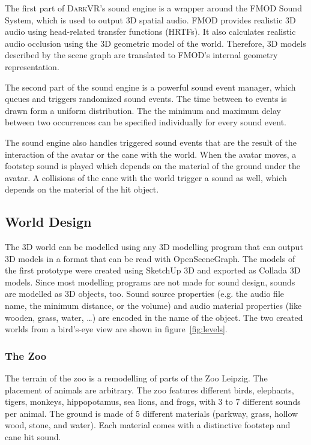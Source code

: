 \documentclass{sig-alternate}
\newcommand{\darkvr}{\textsc{DarkVR}\xspace}
\begin{document}
The first part of \darkvr's sound engine is a wrapper around the FMOD Sound
System\cite{fmod}, which is used to output 3D spatial audio. FMOD provides
realistic 3D audio using head-related transfer functions (HRTFs). It also
calculates realistic audio occlusion using the 3D geometric model of the world.
Therefore, 3D models described by the scene graph are translated to
FMOD's internal geometry representation.

The second part of the sound engine is a powerful sound event manager, which
queues and triggers randomized sound events. The time between to events is drawn
form a uniform distribution. The the minimum and maximum delay between two
occurrences can be specified individually for every sound event.

The sound engine also handles triggered sound events that are the result of the
interaction of the avatar or the cane with the world. When the avatar moves, a
footstep sound is played which depends on the material of the ground under the
avatar. A collisions of the cane with the world trigger a sound as well, which
depends on the material of the hit object.

\subsection{World Design}

The 3D world can be modelled using any 3D modelling program that can output 3D
models in a format that can be read with OpenSceneGraph. The models of the first
prototype were created using SketchUp 3D and exported as Collada 3D models.
Since most modelling programs are not made for sound design, sounds are modelled
as 3D objects, too. Sound source properties (e.g. the audio file name, the
minimum distance, or the volume) and audio material properties (like wooden,
grass, water, \dots) are encoded in the name of the object. The two created
worlds from a bird's-eye view are shown in figure~\ref{fig:levels}.

\subsubsection{The Zoo}

The terrain of the zoo is a remodelling of parts of the Zoo
Leipzig\cite{zooleipzig}. The placement of animals are arbitrary. The zoo
features different birds, elephants, tigers, monkeys, hippopotamus, sea lions,
and frogs, with 3 to 7 different sounds per animal. The ground is made of 5
different materials (parkway, grass, hollow wood, stone, and water). Each
material comes with a distinctive footstep and cane hit sound.
\end{document}

